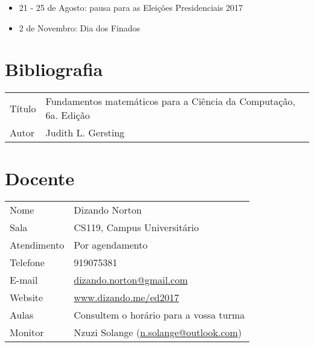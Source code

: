 \begin{itemize}
  \item 21 - 25 de Agosto: pausa para as Eleições Presidenciais 2017
  \item 2 de Novembro: Dia dos Finados
\end{itemize}

\section*{Bibliografia}

\begin{table}[H]
	\begin{tabular}{ll}%
		Título & Fundamentos matemáticos para a Ciência da Computação, 6a. Edição\\
		Autor & Judith L. Gersting\\
	\end{tabular}
\end{table}

\section*{Docente}

\begin{table}[H]
	\begin{tabular}{ll}%
		Nome 			& Dizando Norton \\ 
	    Sala			& CS119, Campus Universitário\\
	    Atendimento 	& Por agendamento \\
	    Telefone		& 919075381\\
	    E-mail			& \url{dizando.norton@gmail.com}\\
	    Website			& \url{www.dizando.me/ed2017}\\
	    Aulas 			& Consultem o horário para a vossa turma\\
	    Monitor			& Nzuzi Solange (\url{n.solange@outlook.com})\\
	\end{tabular}
\end{table}






